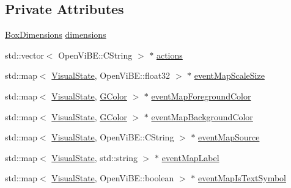 \subsection*{Private Attributes}
\begin{DoxyCompactItemize}
\item 
\hyperlink{structOpenViBEApplications_1_1__BoxDimensions}{BoxDimensions} \hyperlink{classOpenViBEApplications_1_1P300KeyDescriptor_a136db79f09f06c3fbc2850c4e05588f4}{dimensions}
\item 
std::vector$<$ OpenViBE::CString $>$ $\ast$ \hyperlink{classOpenViBEApplications_1_1P300KeyDescriptor_ac47e92205bf0b553a77923f8182be092}{actions}
\item 
std::map$<$ \hyperlink{ova__defines_8h_ac2575a0c79ceb4592555fa66f173dfc8}{VisualState}, OpenViBE::float32 $>$ $\ast$ \hyperlink{classOpenViBEApplications_1_1P300KeyDescriptor_ae65d2d67876a985384a682b7fc47eda2}{eventMapScaleSize}
\item 
std::map$<$ \hyperlink{ova__defines_8h_ac2575a0c79ceb4592555fa66f173dfc8}{VisualState}, \hyperlink{structOpenViBEApplications_1_1GColor}{GColor} $>$ $\ast$ \hyperlink{classOpenViBEApplications_1_1P300KeyDescriptor_abf2e45d487a40baae005baacde8c05f5}{eventMapForegroundColor}
\item 
std::map$<$ \hyperlink{ova__defines_8h_ac2575a0c79ceb4592555fa66f173dfc8}{VisualState}, \hyperlink{structOpenViBEApplications_1_1GColor}{GColor} $>$ $\ast$ \hyperlink{classOpenViBEApplications_1_1P300KeyDescriptor_ac777c1ed3373c3a7b7f8a628e80436ed}{eventMapBackgroundColor}
\item 
std::map$<$ \hyperlink{ova__defines_8h_ac2575a0c79ceb4592555fa66f173dfc8}{VisualState}, OpenViBE::CString $>$ $\ast$ \hyperlink{classOpenViBEApplications_1_1P300KeyDescriptor_aaff43e7c9da92565ed47d181c4c69b33}{eventMapSource}
\item 
std::map$<$ \hyperlink{ova__defines_8h_ac2575a0c79ceb4592555fa66f173dfc8}{VisualState}, std::string $>$ $\ast$ \hyperlink{classOpenViBEApplications_1_1P300KeyDescriptor_acb8b5f94f436944aa5c528bb9d3601b8}{eventMapLabel}
\item 
std::map$<$ \hyperlink{ova__defines_8h_ac2575a0c79ceb4592555fa66f173dfc8}{VisualState}, OpenViBE::boolean $>$ $\ast$ \hyperlink{classOpenViBEApplications_1_1P300KeyDescriptor_a3ca2fb59895cdc4f5093f28169415d86}{eventMapIsTextSymbol}
\end{DoxyCompactItemize}


